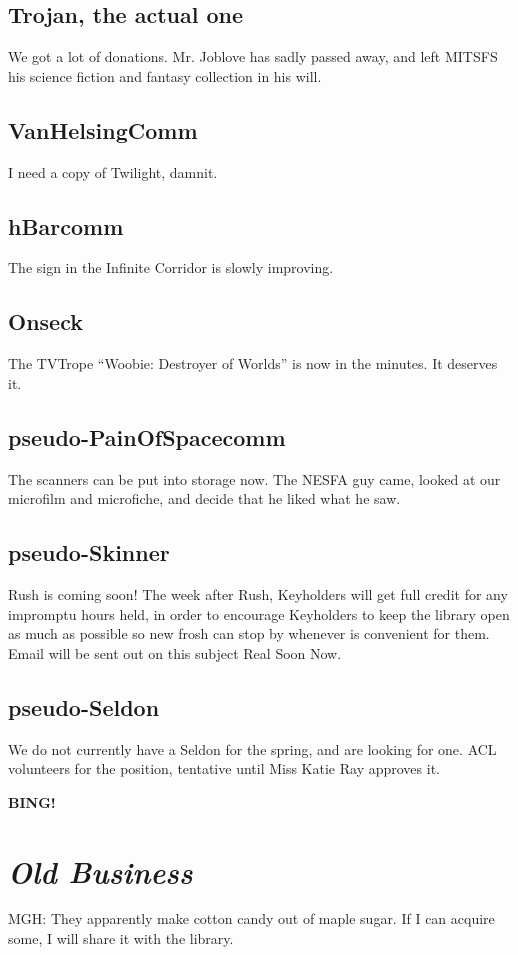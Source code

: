 \documentclass[10pt]{article}
\newcommand{\bing}{{\bf BING!} }
\newcommand{\goto}[1]{\bing \vskip 12pt \section*{{\em{#1}}}}
\begin{document}
\subsection*{Trojan, the actual one}
We got a lot of donations. Mr. Joblove has sadly passed away, and left MITSFS his science fiction and fantasy collection in his will.

\subsection*{VanHelsingComm}
I need a copy of Twilight, damnit.

\subsection*{hBarcomm}
The sign in the Infinite Corridor is slowly improving.

\subsection*{Onseck}
The TVTrope ``Woobie: Destroyer of Worlds'' is now in the minutes. It deserves it.

\subsection*{pseudo-PainOfSpacecomm}
The scanners can be put into storage now. The NESFA guy came, looked at our microfilm and microfiche, and decide that he liked what he saw.

\subsection*{pseudo-Skinner}
Rush is coming soon! The week after Rush, Keyholders will get full credit for any impromptu hours held, in order to encourage Keyholders to keep the library open as much as possible so new frosh can stop by whenever is convenient for them. Email will be sent out on this subject Real Soon Now.

\subsection*{pseudo-Seldon}
We do not currently have a Seldon for the spring, and are looking for one. ACL volunteers for the position, tentative until Miss Katie Ray approves it. 

\goto{Old Business}

MGH: They apparently make cotton candy out of maple sugar. If I can acquire some, I will share it with the library.
\end{document}
